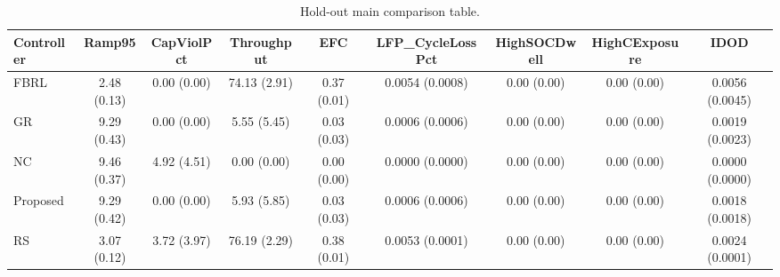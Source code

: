 \begin{table}[t]
\centering
\caption{Hold-out main comparison table.}
\label{tab:holdout_main_auto}
\begin{tabular}{lcccccccc}
\toprule
Controller & Ramp95 & CapViolPct & Throughput & EFC & LFP\_CycleLossPct & HighSOCDwell & HighCExposure & IDOD \\
\midrule
FBRL & 2.48 (0.13) & 0.00 (0.00) & 74.13 (2.91) & 0.37 (0.01) & 0.0054 (0.0008) & 0.00 (0.00) & 0.00 (0.00) & 0.0056 (0.0045) \\
GR & 9.29 (0.43) & 0.00 (0.00) & 5.55 (5.45) & 0.03 (0.03) & 0.0006 (0.0006) & 0.00 (0.00) & 0.00 (0.00) & 0.0019 (0.0023) \\
NC & 9.46 (0.37) & 4.92 (4.51) & 0.00 (0.00) & 0.00 (0.00) & 0.0000 (0.0000) & 0.00 (0.00) & 0.00 (0.00) & 0.0000 (0.0000) \\
Proposed & 9.29 (0.42) & 0.00 (0.00) & 5.93 (5.85) & 0.03 (0.03) & 0.0006 (0.0006) & 0.00 (0.00) & 0.00 (0.00) & 0.0018 (0.0018) \\
RS & 3.07 (0.12) & 3.72 (3.97) & 76.19 (2.29) & 0.38 (0.01) & 0.0053 (0.0001) & 0.00 (0.00) & 0.00 (0.00) & 0.0024 (0.0001) \\
\bottomrule
\end{tabular}
\end{table}